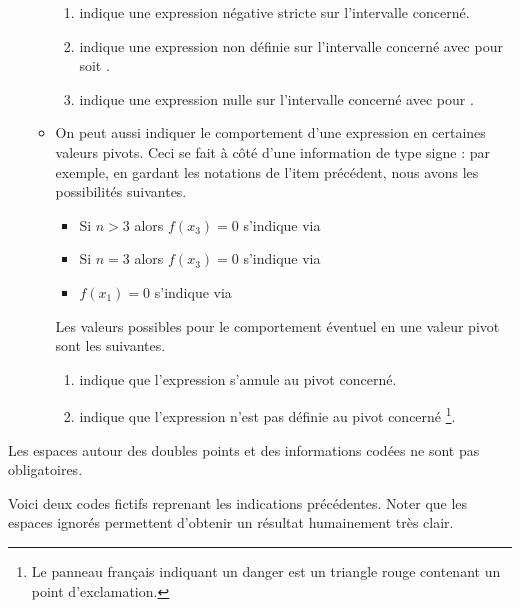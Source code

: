 \documentclass[10pt, a4paper]{article}
\begin{document}
\begin{enumerate}
\begin{itemize}
\begin{enumerate}
			\item \tdocinlatex{-} indique une expression négative stricte sur l'intervalle concerné.
			
			\item {} indique une expression non définie sur l'intervalle concerné avec  pour  soit 
.
	
			\item {} indique une expression nulle sur l'intervalle concerné avec  pour .
		\end{enumerate}

        
        \item On peut aussi indiquer le comportement d'une expression en certaines valeurs pivots. Ceci se fait à côté d'une information de type signe : par exemple, en gardant les notations de l'item précédent, nous avons les possibilités suivantes.
        \begin{itemize}
        	\item Si $n > 3$ alors $f(x_3) = 0$ s'indique via 
	
        	\item Si $n = 3$ alors $f(x_3) = 0$ s'indique via 
	
        	\item $f(x_1) = 0$ s'indique via 	
        \end{itemize}
        Les valeurs possibles pour le comportement éventuel en une valeur pivot sont les suivantes.
		\begin{enumerate}
			\item {} indique que 
l'expression s'annule au pivot concerné.
			
			\item \tdocinlatex{!} indique que 
l'expression n'est pas définie au pivot concerné
        	\footnote{
        		Le panneau français indiquant un danger est un triangle rouge contenant un point d'exclamation.
			}.
		\end{enumerate}
    \end{itemize}
\end{enumerate}




\begin{tdocnote}
    Les espaces autour des doubles points et des informations codées ne sont pas obligatoires.
\end{tdocnote}




Voici deux codes fictifs reprenant les indications précédentes. Noter que les espaces ignorés permettent d'obtenir un résultat humainement très clair.
\begin{multicols}{2}

\end{multicols}
\end{document}
